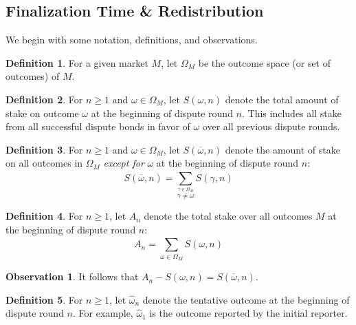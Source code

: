 \documentclass[floatfix,reprint,nofootinbib,amsmath,amssymb,epsfig,pre,floats,letterpaper,groupedaffiliation]{revtex4-1}
\theoremstyle{definition}
\newtheorem{observation}{Observation}
\theoremstyle{definition}
\newtheorem{definition}{Definition}
\begin{document}
\cleardoublepage




\begin{appendix}

\cleardoublepage

\section{Finalization Time \& Redistribution}\label{section:finalization_time}

We begin with some notation, definitions, and observations.

\begin{definition}
For a given market $M$, let ${\Omega}_M$ be the outcome space (or set of outcomes) of $M$.
\end{definition}

\begin{definition}
For $n \geq 1$ and $\omega \in {\Omega}_M$,  let $S(\omega,n)$ denote the total amount of stake on outcome $\omega$ at the beginning of dispute round $n$. This includes all stake from all successful dispute bonds in favor of $\omega$ over all previous dispute rounds.
\end{definition}

\begin{definition}
For $n \geq 1$ and $\omega \in {\Omega}_M$, let $S(\overline{\omega},n)$ denote the amount of stake on all outcomes in ${\Omega}_M$ \emph{except for} $\omega$ at the beginning of dispute round $n$:
\[ S(\overline{\omega},n)= \sum_{\overset{\gamma \in {\Omega}_M}{\gamma \neq \omega}}^{} S(\gamma,n) \]
\end{definition}

\begin{definition}
For $n \ge 1$, let $A_n$ denote the total stake over all outcomes $M$ at the beginning of dispute round $n$: \[ A_n = \sum_{\omega \in {\Omega}_M}^{} S(\omega,n) \]
\end{definition}

\begin{observation}\label{ob:stake_partition}
It follows that $A_n - S(\omega,n) = S(\overline{\omega},n)$.
\end{observation}

\begin{definition}
For $n \geq 1$, let $\hat{\omega}_{n}$ denote the tentative outcome at the beginning of dispute round $n$.  For example, $\hat{\omega}_{1}$ is the outcome reported by the initial reporter.
\end{definition}


\end{appendix}
\end{document}
